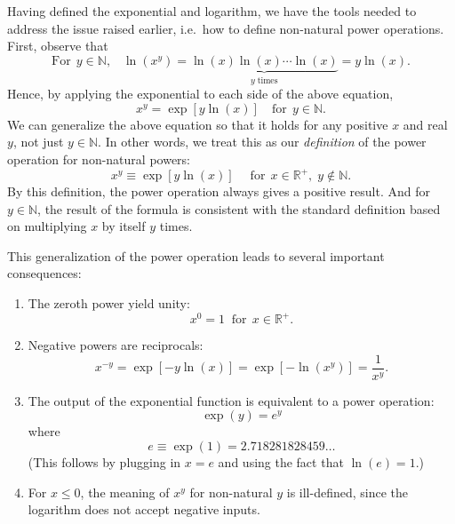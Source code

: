 \documentclass[10pt,a4paper]{article}
\begin{document}
Having defined the exponential and logarithm, we have the tools needed
to address the issue raised earlier, i.e.~how to define non-natural
power operations. First, observe that
\begin{equation}
  \textrm{For}\;\,y \in \mathbb{N}, \;\;\;\ln(x^y) = \underbrace{\ln(x)\ln(x)\cdots\ln(x)}_{y\;\text{times}} = y \ln(x).
\end{equation}
Hence, by applying the exponential to each side of the above equation,
\begin{equation}
  x^y = \exp[y \ln(x)] \quad \mathrm{for} \;\,y \in \mathbb{N}.
\end{equation}
We can generalize the above equation so that it holds for any positive
$x$ and real $y$, not just $y \in \mathbb{N}$. In other words, we
treat this as our \emph{definition} of the power operation for
non-natural powers:
\begin{equation}
  x^y \equiv \exp[y \ln(x)] \quad\; \mathrm{for}\;\, x \in \mathbb{R}^+, \;y \notin \mathbb{N}.
\end{equation}
By this definition, the power operation always gives a positive result.
And for $y \in \mathbb{N}$, the result of the formula is consistent
with the standard definition based on multiplying $x$ by itself $y$
times.

This generalization of the power operation leads to several important
consequences:
\begin{enumerate}
\item The zeroth power yield unity:
  \begin{equation}
    \displaystyle x^0 = 1 \;\;\mathrm{for}\;\, x \in \mathbb{R}^+.
  \end{equation}

\item Negative powers are reciprocals:
  \begin{equation}
    x^{-y} = \exp[-y\ln(x)] = \exp[-\ln(x^y)] = \frac{1}{x^y}.
  \end{equation}

\item The output of the exponential function is equivalent to a power
  operation:
  \begin{equation}
    \exp(y) = e^y
  \end{equation}
  where
  \begin{equation}
    e \equiv \exp(1) = 2.718281828459\!\dots
  \end{equation}
  (This follows by plugging in $x=e$ and using the fact that $\ln(e) =
  1$.)

\item For $x \le 0$, the meaning of $x^y$ for non-natural $y$ is
  ill-defined, since the logarithm does not accept negative inputs.
\end{enumerate}
\end{document}
